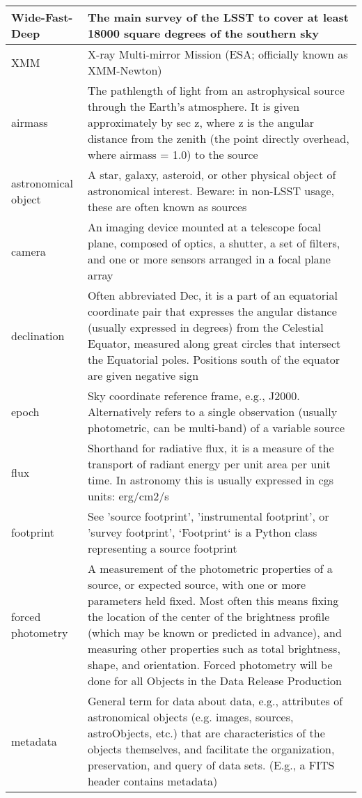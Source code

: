 \begin{longtable}{|p{}|p{}|}
Wide-Fast-Deep & The main survey of the \gls{LSST} to cover at least 18000 square degrees of the southern sky \\\hline
XMM & X-ray Multi-mirror Mission (\gls{ESA}; officially known as \gls{XMM}-Newton) \\\hline
airmass & The pathlength of light from an astrophysical source through the Earth's atmosphere. It is given approximately by sec z, where z is the angular distance from the zenith (the point directly overhead, where \gls{airmass} = 1.0) to the source \\\hline
astronomical object & A star, galaxy, asteroid, or other physical object of astronomical interest. Beware: in non-LSST usage, these are often known as sources \\\hline
camera & An imaging device mounted at a telescope focal plane, composed of optics, a shutter, a set of filters, and one or more sensors arranged in a focal plane array \\\hline
declination & Often abbreviated Dec, it is a part of an equatorial coordinate pair that expresses the angular distance (usually expressed in degrees) from the Celestial Equator, measured along great circles that intersect the Equatorial poles. Positions south of the equator are given negative sign \\\hline
epoch & Sky coordinate reference frame, e.g., J2000. Alternatively refers to a single observation (usually photometric, can be multi-band) of a variable source \\\hline
flux & Shorthand for radiative \gls{flux}, it is a measure of the transport of radiant energy per unit area per unit time. In astronomy this is usually expressed in cgs units: erg/cm2/s \\\hline
footprint & See 'source footprint', 'instrumental footprint', or 'survey footprint', `Footprint` is a Python class representing a \gls{source footprint} \\\hline
forced photometry & A measurement of the photometric properties of a source, or expected source, with one or more parameters held fixed. Most often this means fixing the location of the center of the brightness profile (which may be known or predicted in advance), and measuring other properties such as total brightness, \gls{shape}, and orientation. Forced photometry will be done for all Objects in the \gls{Data Release Production} \\\hline
metadata & General term for data about data, e.g., attributes of astronomical objects (e.g. images, sources, astroObjects, etc.) that are characteristics of the objects themselves, and facilitate the organization, preservation, and query of data sets. (E.g., a \gls{FITS} header contains \gls{metadata}) \\\hline

\end{longtable}
